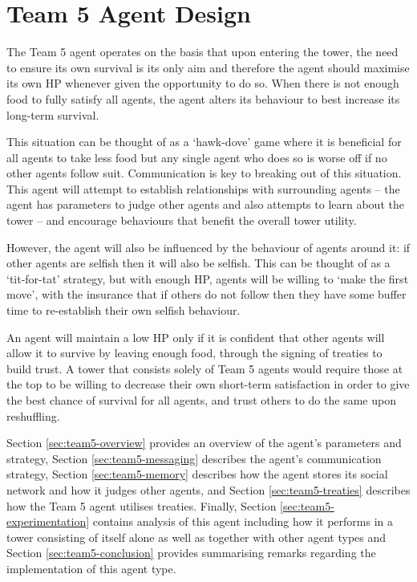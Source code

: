 \chapter{Team 5 Agent Design}\label{team_5_agent_design}

The Team 5 agent operates on the basis that upon entering the tower, the need to ensure its own survival is its only aim and therefore the agent should maximise its own HP whenever given the opportunity to do so. When there is not enough food to fully satisfy all agents, the agent alters its behaviour to best increase its long-term survival.

This situation can be thought of as a `hawk-dove' game where it is beneficial for all agents to take less food but any single agent who does so is worse off if no other agents follow suit. Communication is key to breaking out of this situation. This agent will attempt to establish relationships with surrounding agents -- the agent has parameters to judge other agents and also attempts to learn about the tower -- and encourage behaviours that benefit the overall tower utility.

However, the agent will also be influenced by the behaviour of agents around it: if other agents are selfish then it will also be selfish. This can be thought of as a `tit-for-tat' strategy, but with enough HP, agents will be willing to `make the first move', with the insurance that if others do not follow then they have some buffer time to re-establish their own selfish behaviour.

An agent will maintain a low HP only if it is confident that other agents will allow it to survive by leaving enough food, through the signing of treaties to build trust. A tower that consists solely of Team 5 agents would require those at the top to be willing to decrease their own short-term satisfaction in order to give the best chance of survival for all agents, and trust others to do the same upon reshuffling.

Section \ref{sec:team5-overview} provides an overview of the agent's parameters and strategy, Section \ref{sec:team5-messaging} describes the agent's communication strategy, Section \ref{sec:team5-memory} describes how the agent stores its social network and how it judges other agents, and Section \ref{sec:team5-treaties} describes how the Team 5 agent utilises treaties. Finally, Section \ref{sec:team5-experimentation} contains analysis of this agent including how it performs in a tower consisting of itself alone as well as together with other agent types and Section \ref{sec:team5-conclusion} provides summarising remarks regarding the implementation of this agent type.

